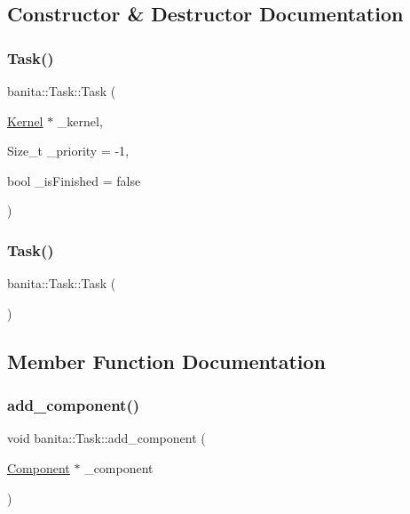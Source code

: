 \subsection{Constructor \& Destructor Documentation}
\mbox{\label{classbanita_1_1_task_ae212c6c6b6f007e953ba8406d82528be}} 
\subsubsection{\texorpdfstring{Task()}{Task()}\hspace{0.1cm}{\footnotesize\ttfamily [1/2]}}
{\footnotesize\ttfamily banita\+::\+Task\+::\+Task (\begin{DoxyParamCaption}\item[{\mbox{\hyperlink{classbanita_1_1_kernel}{Kernel}} $\ast$}]{\+\_\+kernel,  }\item[{Size\+\_\+t}]{\+\_\+priority = {\ttfamily -\/1},  }\item[{bool}]{\+\_\+is\+Finished = {\ttfamily false} }\end{DoxyParamCaption})}

\mbox{\label{classbanita_1_1_task_add906131c42cec4d75df03eceeb870e6}} 
\subsubsection{\texorpdfstring{Task()}{Task()}\hspace{0.1cm}{\footnotesize\ttfamily [2/2]}}
{\footnotesize\ttfamily banita\+::\+Task\+::\+Task (\begin{DoxyParamCaption}{ }\end{DoxyParamCaption})}



\subsection{Member Function Documentation}
\mbox{\label{classbanita_1_1_task_ab0d9e75daff35c07cdb6bea71d0bf605}} 
\subsubsection{\texorpdfstring{add\_component()}{add\_component()}}
{\footnotesize\ttfamily void banita\+::\+Task\+::add\+\_\+component (\begin{DoxyParamCaption}\item[{\mbox{\hyperlink{classbanita_1_1_component}{Component}} $\ast$}]{\+\_\+component }\end{DoxyParamCaption})\hspace{0.3cm}{\ttfamily [inline]}}

